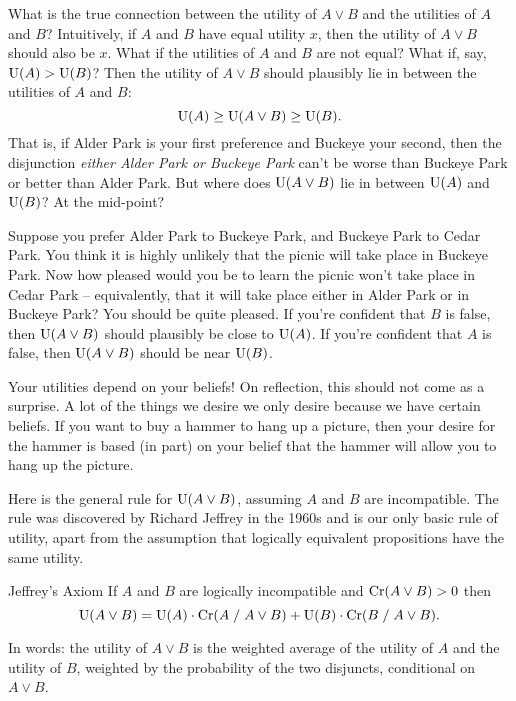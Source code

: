 What is the true connection between the utility of $A \lor B$ and the utilities
of $A$ and $B$? Intuitively, if $A$ and $B$ have equal utility $x$, then the
utility of $A \lor B$ should also be $x$. What if the utilities of $A$ and $B$
are not equal? What if, say, $\text{U}(A) > \text{U}(B)$? Then the utility of $A \lor B$
should plausibly lie in between the utilities of $A$ and $B$:
\[
  \text{U}(A) \geq \text{U}(A \lor B) \geq \text{U}(B).
\]
That is, if Alder Park is your first preference and Buckeye your second, then
the disjunction \emph{either Alder Park or Buckeye Park} can't be
worse than Buckeye Park or better than Alder Park. But where does $\text{U}(A
\lor B)$ lie in between $\text{U}(A)$ and $\text{U}(B)$? At the mid-point?

Suppose you prefer Alder Park to Buckeye Park, and Buckeye Park to
Cedar Park. You think it is highly unlikely that the picnic will take
place in Buckeye Park. Now how pleased would you be to learn the
picnic won't take place in Cedar Park -- equivalently, that it will
take place either in Alder Park or in Buckeye Park? You should be
quite pleased. If you're confident that $B$ is false, then
$\text{U}(A \lor B)$ should plausibly be close to $\text{U}(A)$. If you're confident
that $A$ is false, then $\text{U}(A \lor B)$ should be near $\text{U}(B)$.

Your utilities depend on your beliefs! On reflection, this should not come as a
surprise. A lot of the things we desire we only desire because we have certain
beliefs. If you want to buy a hammer to hang up a picture, then your desire for
the hammer is based (in part) on your belief that the hammer will allow you to
hang up the picture.


Here is the general rule for $\text{U}(A \lor B)$, assuming $A$ and $B$ are
incompatible. The rule was discovered by Richard Jeffrey in the 1960s and is our
only basic rule of utility, apart from the assumption that logically equivalent
propositions have the same utility.
%
\begin{genericthm}{Jeffrey's Axiom}
  If $A$ and $B$ are logically incompatible and  $\text{Cr}(A\lor B) > 0$ then
  \vspace{-2mm}
  \[
    \text{U}(A \lor B) =
    \text{U}(A)\cdot \text{Cr}(A\;/\;A\lor B) + \text{U}(B)\cdot \text{Cr}(B\;/\;A \lor B).
  \]
\end{genericthm}
%
\noindent%
In words: the utility of $A \lor B$ is the weighted average of the utility of
$A$ and the utility of $B$, weighted by the probability of the two disjuncts,
conditional on $A \lor B$.

